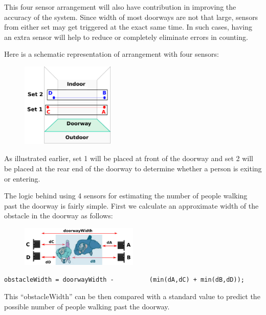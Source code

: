 \begin{multicols}{2}
  This four sensor arrangement will also have contribution in
  improving the accuracy of the system. Since width of most doorways
  are not that large, sensors from either set may get triggered at the
  exact same time. In such cases, having an extra sensor will help to
  reduce or completely eliminate errors in counting.

  Here is a schematic representation of arrangement with four sensors:

  \begin{figure}[H]
    \includegraphics[width=0.4\textwidth,inner]{fourultrasonic.png}
  \end{figure}

  As illustrated earlier, set 1 will be placed at front of the doorway
  and set 2 will be placed at the rear end of the doorway to determine
  whether a person is exiting or entering.

  The logic behind using 4 sensors for estimating the number of people
  walking past the doorway is fairly simple. First we calculate an
  approximate width of the obstacle in the doorway as follows:

\begin{figure}[H]
  \centering
  \includegraphics[width=0.5\textwidth]{people-walking-simultaenously.jpeg}
\end{figure}

\verb|obstacleWidth = doorwayWidth -|\newline
\verb|         (min(dA,dC) + min(dB,dD));|

  This ``obstacleWidth'' can be then compared with a standard value to
  predict the possible number of people walking past the doorway.

  \end{multicols}


